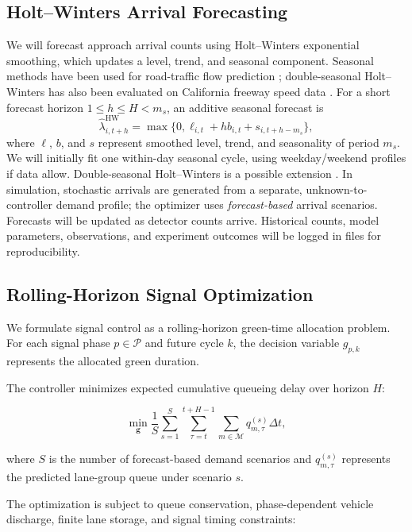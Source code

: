 \documentclass[letterpaper,12pt,conference]{ieeeconf}
\begin{document}
\subsection{Holt--Winters Arrival Forecasting}
We will forecast approach arrival counts using Holt--Winters exponential smoothing, which updates a level, trend, and seasonal component. Seasonal methods have been used for road-traffic flow prediction \cite{williams1998}; double-seasonal Holt--Winters has also been evaluated on California freeway speed data \cite{yu2016}. For a short forecast horizon $1\leq h\leq H<m_s$, an additive seasonal forecast is
\begin{equation}
\hat\lambda^{\mathrm{HW}}_{i,t+h}=\max\{0,\ell_{i,t}+hb_{i,t}+s_{i,t+h-m_s}\},
\label{eq:forecast}
\end{equation}
where $\ell$, $b$, and $s$ represent smoothed level, trend, and seasonality of period $m_s$. We will initially fit one within-day seasonal cycle, using weekday/weekend profiles if data allow. Double-seasonal Holt--Winters is a possible extension \cite{gould2008}. In simulation, stochastic arrivals are generated from a separate, unknown-to-controller demand profile; the optimizer uses \emph{forecast-based} arrival scenarios. Forecasts will be updated as detector counts arrive. Historical counts, model parameters, observations, and experiment outcomes will be logged in files for reproducibility.

\subsection{Rolling-Horizon Signal Optimization}

We formulate signal control as a rolling-horizon green-time allocation problem. For each signal phase $p\in\mathcal P$ and future cycle $k$, the decision variable $g_{p,k}$ represents the allocated green duration.

The controller minimizes expected cumulative queueing delay over horizon $H$:

\begin{equation}
\min_{\mathbf g}
\frac{1}{S}\sum_{s=1}^{S}
\sum_{\tau=t}^{t+H-1}
\sum_{m\in\mathcal M}
q_{m,\tau}^{(s)}\Delta t,
\label{eq:mpc}
\end{equation}

where $S$ is the number of forecast-based demand scenarios and $q_{m,\tau}^{(s)}$ represents the predicted lane-group queue under scenario $s$.

The optimization is subject to queue conservation, phase-dependent vehicle discharge, finite lane storage, and signal timing constraints:
\end{document}
